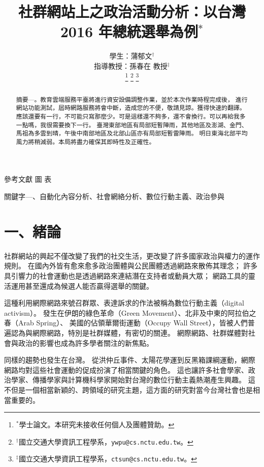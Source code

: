 \documentclass[letterpaper, 10pt, conference]{ieeeconf}   %
\title{\LARGE \bf
社群網站上之政治活動分析：以台灣 2016 年總統選舉為例$^{\ast}$
}
\author{\parbox{3 in}{\centering 學生：蒲郁文$^{\dagger}$}
        \hspace*{0.5 in}
        \parbox{3 in}{\centering 指導教授：孫春在 教授$^{\ddagger}$}
        \thanks{$^{\ast}$學士論文。本研究未接收任何個人及團體贊助。}
        \thanks{$^{\dagger}$國立交通大學資訊工程學系，{\tt\small ywpu@cs.nctu.edu.tw}。}
        \thanks{$^{\ddagger}$國立交通大學資訊工程學系，{\tt\small ctsun@cs.nctu.edu.tw}。}
}
\begin{document}
\begin{CJK}{UTF8}{bsmi}
\onehalfspacing
\refname{參考文獻}
\figurename{圖}
\tablename{表}

\maketitle
\thispagestyle{empty}
\pagestyle{empty}


\begin{abstract}
摘要\enskip---。教育雲端服務平臺將進行資安設備調整作業，並於本次作業時程完成後，
進行網站功能測試，屆時網路服務將會中斷，造成您的不便，敬請見諒。獲得快速的翻譯。
應該還要有一行，不可能只寫那麼少。可是這樣還不夠多，還不會換行。可以再給我多一點嗎，我很需要換下一行。
臺灣東部地區有局部短暫陣雨，其他地區及澎湖、金門、馬祖為多雲到晴，午後中南部地區及北部山區亦有局部短暫雷陣雨。
明日東海北部平均風力將稍減弱。本局將盡力確保其即時性及正確性。
\end{abstract}

\begin{keywords}
關鍵字\enskip---、自動化內容分析、社會網絡分析、數位行動主義、政治參與
\end{keywords}


\section*{一、緒論}

社群網站的興起不僅改變了我們的社交生活，更改變了許多國家政治與權力的運作規則。
在國內外皆有愈來愈多政治團體與公民團體透過網路來散佈其理念；
許多具引響力的社會運動也是透過網路來連結潛在支持者或動員大眾；
網路工具的靈活運用甚至還成為候選人能否贏得選舉的關鍵。

這種利用網際網路來號召群眾、表達訴求的作法被稱為數位行動主義（digital activism）。
發生在伊朗的綠色革命（Green Movement）、北非及中東的阿拉伯之春（Arab Spring）、
美國的佔領華爾街運動（Occupy Wall Street），皆被人們普遍認為與網際網路，特別是社群媒體，有密切的關連。
網際網路、社群媒體對社會與政治的影響也成為許多學者關注的新焦點。

同樣的趨勢也發生在台灣。
從洪仲丘事件、太陽花學運到反黑箱課綱運動，網際網路均對這些社會運動的促成扮演了相當關鍵的角色。
這也讓許多社會學家、政治學家、傳播學家與計算機科學家開始對台灣的數位行動主義熱潮產生興趣。
這不但是一個相當新穎的、跨領域的研究主題，這方面的研究對當今台灣社會也是相當重要的。


\end{CJK}
\end{document}
